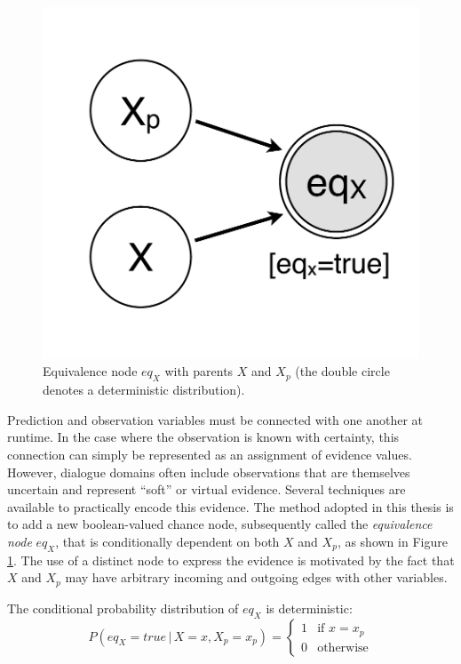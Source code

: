 \begin{figure}
\vspace{-5mm}
\centering
\includegraphics[scale=0.25]{imgs/prediction.pdf} 
\vspace{-2mm}
\caption{Equivalence node $\mathit{eq}_{X}$ with parents $X$ and $X_p$ (the double circle denotes a deterministic distribution).}
\label{fig:prediction}
\end{figure}

Prediction and observation variables must be connected with one another at runtime.  In the case where the observation is known with certainty, this connection can simply be represented as an assignment of evidence values.  However, dialogue domains often include observations that are themselves uncertain and represent ``soft'' or virtual evidence.  Several techniques are available to practically encode this evidence. The method adopted in this thesis is to add a new boolean-valued chance node, subsequently called the \textit{equivalence node} $\mathit{eq}_{X}$, that is conditionally dependent on both $X$ and $X_p$, as shown in Figure \ref{fig:prediction}. The use of a distinct node to express the evidence is motivated by the fact that $X$ and $X_p$ may have arbitrary incoming and outgoing edges with other variables. 

The conditional probability distribution of $\mathit{eq}_X$ is deterministic:
\begin{equation}
P(\mathit{eq}_{X}\!=\!true \, | \, X\!=\!x, X_p\!=\!x_p) = \begin{cases}
1 & \text{if } x = x_p \\
0 & \text{otherwise}
\end{cases} \label{eq:equivdistrib}
\end{equation}

